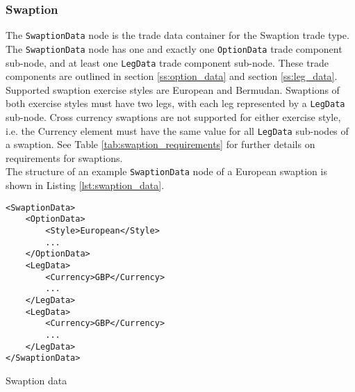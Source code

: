 \subsubsection{Swaption}

The \lstinline!SwaptionData!  node is the trade data container for the Swaption trade type. The \lstinline!SwaptionData!
node has one and exactly one \lstinline!OptionData! trade component sub-node, and at least one \lstinline!LegData! trade
component sub-node.  These trade components are outlined in section \ref{ss:option_data} and section
\ref{ss:leg_data}.\\
\vspace{5mm}
Supported swaption exercise styles are European and Bermudan.  Swaptions of both exercise styles must have two legs, with
each leg represented by a \lstinline!LegData! sub-node.  Cross currency swaptions are not supported for either exercise style, i.e. the Currency element must
have the same value for all \lstinline!LegData! sub-nodes of a swaption. See Table \ref{tab:swaption_requirements} for further details on requirements for
 swaptions.\\
\vspace{5mm}
The structure of an example \lstinline!SwaptionData!  node of a European swaption is shown in Listing
\ref{lst:swaption_data}.

\begin{listing}[H]
\begin{verbatim}
<SwaptionData>
    <OptionData>
        <Style>European</Style>
        ...
    </OptionData>
    <LegData>
        <Currency>GBP</Currency>
        ...
    </LegData>
    <LegData>
        <Currency>GBP</Currency>
        ...
    </LegData>
</SwaptionData>
\end{verbatim}
\caption{Swaption data}
\label{lst:swaption_data}
\end{listing}

